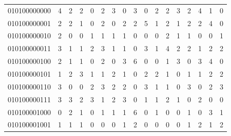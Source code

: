 \documentclass[10pt,a4paper]{article}
\begin{document}
\begin{longtable}{ |c|c|c|c|c|c|c|c|c|c|c|c|c|c|c|c|c| }
    010100000000              & 4                            & 2                                & 2                            & 0                              & 2   & 3   & 0   & 3   & 0   & 2   & 2   & 3   & 2   & 4   & 1   & 0   \\
    010100000001              & 2                            & 2                                & 1                            & 0                              & 2   & 0   & 2   & 2   & 5   & 1   & 2   & 1   & 2   & 2   & 4   & 0   \\
    010100000010              & 2                            & 0                                & 0                            & 1                              & 1   & 1   & 1   & 0   & 0   & 0   & 2   & 1   & 1   & 0   & 0   & 1   \\
    010100000011              & 3                            & 1                                & 1                            & 2                              & 3   & 1   & 1   & 0   & 3   & 1   & 4   & 2   & 2   & 1   & 2   & 2   \\
    010100000100              & 2                            & 1                                & 1                            & 0                              & 2   & 0   & 3   & 6   & 0   & 0   & 1   & 3   & 0   & 3   & 4   & 0   \\
    010100000101              & 1                            & 2                                & 3                            & 1                              & 1   & 2   & 1   & 0   & 2   & 2   & 1   & 0   & 1   & 1   & 2   & 2   \\
    010100000110              & 3                            & 0                                & 0                            & 2                              & 3   & 2   & 2   & 0   & 3   & 1   & 1   & 0   & 3   & 0   & 2   & 3   \\
    010100000111              & 3                            & 3                                & 2                            & 3                              & 1   & 2   & 3   & 0   & 1   & 1   & 2   & 1   & 0   & 2   & 0   & 0   \\
    010100001000              & 0                            & 2                                & 1                            & 0                              & 1   & 1   & 1   & 6   & 0   & 1   & 0   & 0   & 1   & 0   & 3   & 1   \\
    010100001001              & 1                            & 1                                & 1                            & 0                              & 0   & 0   & 1   & 2   & 0   & 0   & 0   & 0   & 1   & 2   & 1   & 2   \\

\end{longtable}
\end{document}
